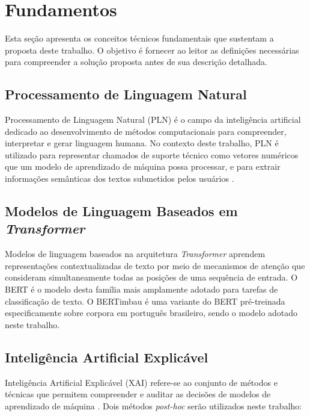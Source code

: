 \documentclass[
    12pt,                %
    openright,           %
    oneside,             %
    a4paper,             %
    english,             %
    brazil               %
]{abntex2}
\begin{document}
\section{Fundamentos}
\label{sec:fundamentos}
 
Esta seção apresenta os conceitos técnicos fundamentais que sustentam a proposta deste trabalho. O objetivo é fornecer ao leitor as definições necessárias para compreender a solução proposta antes de sua descrição detalhada.
 
\subsection{Processamento de Linguagem Natural}
 
Processamento de Linguagem Natural (PLN) é o campo da inteligência artificial dedicado ao desenvolvimento de métodos computacionais para compreender, interpretar e gerar linguagem humana. No contexto deste trabalho, PLN é utilizado para representar chamados de suporte técnico como vetores numéricos que um modelo de aprendizado de máquina possa processar, e para extrair informações semânticas dos textos submetidos pelos usuários \cite{devlin2019}.
 
\subsection{Modelos de Linguagem Baseados em \textit{Transformer}}
 
Modelos de linguagem baseados na arquitetura \textit{Transformer} \cite{vaswani2017} aprendem representações contextualizadas de texto por meio de mecanismos de atenção que consideram simultaneamente todas as posições de uma sequência de entrada. O BERT \cite{devlin2019} é o modelo desta família mais amplamente adotado para tarefas de classificação de texto. O BERTimbau \cite{souza2020} é uma variante do BERT pré-treinada especificamente sobre corpora em português brasileiro, sendo o modelo adotado neste trabalho.
 
\subsection{Inteligência Artificial Explicável}
 
Inteligência Artificial Explicável (XAI) refere-se ao conjunto de métodos e técnicas que permitem compreender e auditar as decisões de modelos de aprendizado de máquina \cite{salih2023}. Dois métodos \textit{post-hoc} serão utilizados neste trabalho:
 
\end{document}
